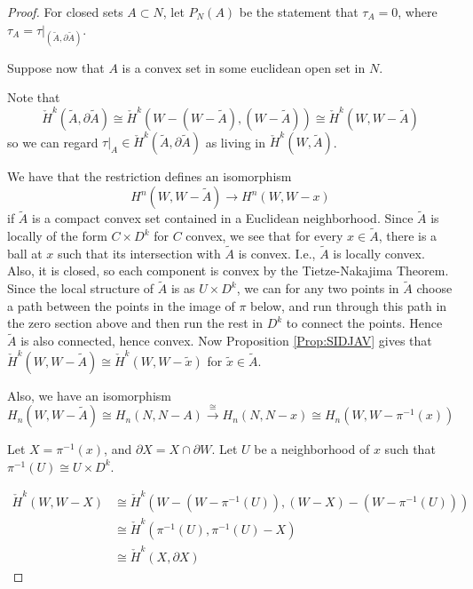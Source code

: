 \documentclass[reqno]{amsart}
\theoremstyle{definition}
\theoremstyle{remark}
\begin{document}
\begin{proof}
     For closed sets $A \subset N$, let
     $P_N (A)$ be the statement that
     $\tau_A = 0$, where
     $\tau_A = \tau|_{\left( \tilde{A}, \partial \tilde{A} \right) }$.

     Suppose now that $A$ is a convex set in some euclidean 
     open set in $N$. 

     Note that
     \[
         \check{H}^{k}(\tilde{A}, \partial \tilde{A})
         \cong \check{H}^{k} (W - (W - \tilde{A}) , (W- \tilde{A}))
         \cong \check{H}^{k} \left( W, W- \tilde{A} \right)
     \]
     so we can regard
     $\tau|_A \in \check{H}^{k}(\tilde{A}, \partial \tilde{A}) $ as
     living in $\check{H}^{k} (W,\tilde{A})$.
     
     We have that the restriction defines an isomorphism
     \[
     H^{n} \left( W, W-\tilde{A} \right) 
     \to H^{n} \left( W, W - x \right) 
     \] 
     if $\tilde{A}$ is a compact convex set contained
     in a Euclidean neighborhood. Since
     $\tilde{A}$ is locally of the form
     $C \times D^{k}$ for $C$ convex, we see that for every
     $x \in \tilde{A}$, there is a ball at $x$ such that
     its intersection with $\tilde{A}$ is convex. I.e.,
     $\tilde{A}$ is locally convex. Also, it is closed, so
     each component is convex by the Tietze-Nakajima Theorem.
     Since the local structure of
     $\tilde{A}$ is as
     $U \times D^{k}$, we can for any two points in
     $\tilde{A}$ choose a path between the points in the
     image of $\pi$ below, and run through this path in the
     zero section above and then run the rest in
     $D^{k}$ to connect the points. Hence
     $\tilde{A}$ is also connected, hence convex.
     Now Proposition \ref{Prop:SIDJAV} gives
     that
     $\check{H}^{k}\left( W, W- \tilde{A} \right) 
     \cong \check{H}^{k} \left( W, W- \tilde{x} \right) $ for
     $\tilde{x} \in \tilde{A}$.


     Also, we have an isomorphism
     \[
     H_n \left( W, W - \tilde{A} \right) \cong H_n (N,N-A)
     \stackrel{\cong}{\to} H_n (N, N - x) \cong
     H_n (W, W - \pi^{-1}(x)) 
     \] 

     Let $X = \pi^{-1}(x)$, and $\partial X = 
     X \cap \partial W$.
     Let $U$ be a neighborhood of $x$ such that
     $\pi^{-1}(U) \cong U \times D^{k}$. 


     \begin{align*}
         \check{H}^{k}(W, W - X) 
         &\cong
         \check{H}^{k}(W - (W - \pi^{-1}(U)), 
         (W- X) - (W - \pi^{-1}(U)))\\
         &\cong \check{H}^{k}(\pi^{-1}(U), \pi^{-1}(U) - X) \\
         &\cong \check{H}^{k}(X , \partial X)
     \end{align*}




\end{proof}
\end{document}
